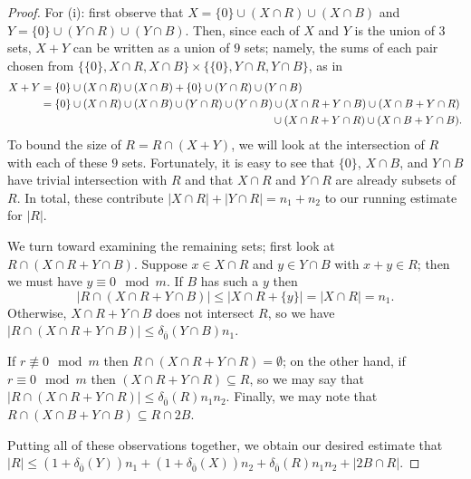 \begin{proof}
For (i): first observe that $X = \{0\}\cup (X\cap R) \cup (X\cap B)$ and $Y = \{0\}\cup (Y\cap R) \cup (Y\cap B)$.
Then, since each of $X$ and $Y$ is the union of $3$ sets, $X+Y$ can be written as a union of $9$ sets; namely, the sums of each pair chosen from $\{\{0\}, X\cap R, X\cap B\} \times \{ \{0\}, Y\cap R, Y\cap B\}$, as in
\begin{align*}
X+Y &= \{0\}\cup (X\cap R) \cup (X\cap B) + \{0\} \cup (Y\cap R) \cup (Y\cap B) \\
&= \{0\}\cup (X\cap R) \cup (X\cap B) \cup (Y\cap R) \cup (Y\cap B) \cup (X\cap R + Y\cap B) \cup (X\cap B + Y\cap R)\\
& \hspace{7.5cm} \hfill \cup (X\cap R + Y\cap R) \cup (X\cap B + Y\cap B).
\end{align*}
To bound the size of $R = R\cap (X+Y)$, we will look at the intersection of $R$ with each of these $9$ sets.  
Fortunately, it is easy to see that $\{0\}$, $X\cap B$, and $Y\cap B$ have trivial intersection with $R$ and that $X\cap R$ and $Y\cap R$ are already subsets of $R$.
In total, these contribute $|X\cap R| + |Y\cap R| = n_1+n_2$ to our running estimate for $|R|$.

We turn toward examining the remaining sets; first look at $R \cap (X\cap R + Y\cap B)$.
Suppose $x\in X\cap R$ and $y\in Y\cap B$ with $x+y\in R$; then we must have $y\equiv 0 \mod m$.
If $B$ has such a $y$ then
\[|R\cap (X\cap R + Y\cap B)| \le |X\cap R + \{y\}| = |X\cap R|=n_1. \]
Otherwise, $X\cap R + Y\cap B$ does not intersect $R$, so we have $|R\cap (X\cap R + Y\cap B)| \le  \delta_{\bar{0}}(Y\cap B) n_1$.


If $r\not\equiv 0 \mod m$ then $R \cap (X\cap R + Y\cap R) =\emptyset$; on the other hand, if $r\equiv 0 \mod m$ then $(X\cap R+Y\cap R)\subseteq R$, so we may say that $|R\cap (X\cap R + Y\cap R)| \le \delta_{\bar{0}}(R) n_1n_2$.
Finally, we may note that $R\cap (X\cap B + Y\cap B) \subseteq R\cap 2B$.

Putting all of these observations together, we obtain our desired estimate that $|R| \le (1+\delta_{\bar{0}}(Y))n_1 + (1+\delta_{\bar{0}}(X))n_2 + \delta_{\bar{0}}(R)n_1n_2 + |2B \cap R|$.


\end{proof}
